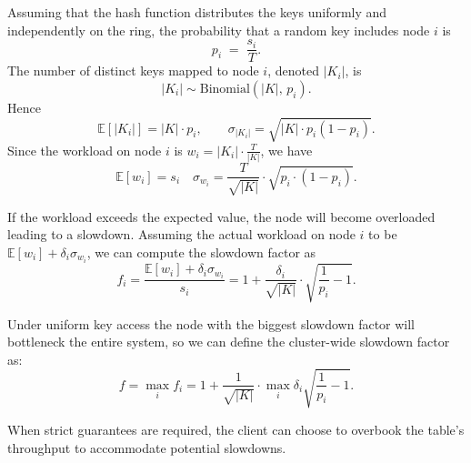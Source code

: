 Assuming that the hash function distributes the keys uniformly and
independently on the ring, the probability that a random key includes node $i$
is
\[
  p_i \;=\; \frac{s_i}{T}.
\]
The number of distinct keys mapped to node $i$, denoted $|K_i|$, is
\[
  |K_i| \sim \mathrm{Binomial}\!\left(|K|,\,p_i\right).
\]
Hence
\[
  \mathbb{E}[|K_i|] = |K| \cdot p_i,
  \qquad
  \sigma_{|K_i|} = \sqrt{|K| \cdot p_i (1 - p_i)}.
\]
Since the workload on node $i$ is $w_i = |K_i| \cdot \frac{T}{|K|}$, we have
\[
    \mathbb{E}[w_i] = s_i
    \quad
    \sigma_{w_i} = \frac{T}{\sqrt{|K|}} \cdot \sqrt{p_i \cdot (1 - p_i)}.
\]

If the workload exceeds the expected value, the node will become overloaded
leading to a slowdown.
Assuming the actual workload on node $i$ to be
$\mathbb{E}[w_i] + \delta_i \sigma_{w_i}$, we can compute the slowdown factor as
\[
    f_i = \frac{\mathbb{E}[w_i] + \delta_i \sigma_{w_i}}{s_i} =
    1 + \frac{\delta_i}{\sqrt{|K|}} \cdot \sqrt{\frac{1}{p_i} - 1}.
\]

Under uniform key access the node with the biggest slowdown factor will
bottleneck the entire system, so we can define the cluster-wide slowdown factor as:
\begin{equation}
    \label{eq:slowdown}
    f = \max_i f_i = 1 + \frac{1}{\sqrt{|K|}} \cdot \max_i \delta_i \sqrt{\frac{1}{p_i} - 1}.
\end{equation}

When strict guarantees are required, the client can choose to overbook the
table's throughput to accommodate potential slowdowns.
